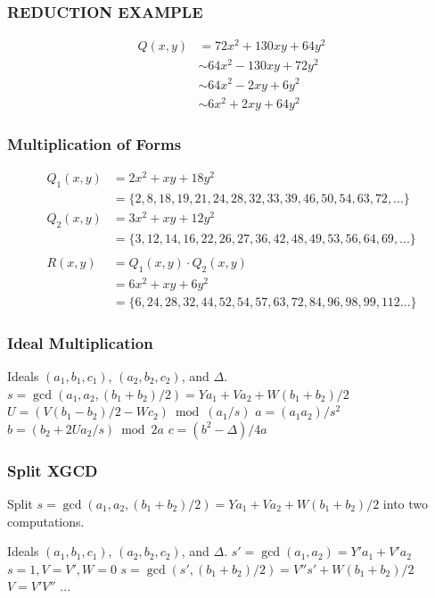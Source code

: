 \documentclass{beamer}
\begin{document}
\begin{frame}
\frametitle{REDUCTION EXAMPLE}
\begin{align*}
Q(x, y) &= 72x^2 + 130xy + 64y^2 \\
&\sim 64x^2 -130xy + 72y^2 \\
&\sim 64x^2 -2xy + 6y^2 \\
&\sim 6x^2 +2xy +64y^2
\end{align*}
\end{frame}

\begin{frame}
\frametitle{Multiplication of Forms}
\begin{align*}
Q_1(x, y) &= 2x^2 + xy + 18y^2 \\
&= \{2,8,18,19,21,24,28,32,33,39,46,50,54,63,72,...\} \\
Q_2(x, y) &= 3x^2 +xy +12y^2 \\
&= \{3,12,14,16,22,26,27,36,42,48,49,53,56,64,69,...\} \\
\\
R(x,y) &= Q_1(x,y) \cdot Q_2(x,y) \\
&= 6x^2 + xy + 6y^2 \\
&= \{6,24,28,32,44,52,54,57,63,72,84,96,98,99,112...\}
\end{align*}
\end{frame}


\begin{frame}
\frametitle{Ideal Multiplication}
\begin{algorithmic}[1]
\Require Ideals $(a_1, b_1, c_1)$, $(a_2, b_2, c_2)$, and $\Delta$.
\State $s = \gcd(a_1, a_2, (b_1+b_2)/2) = Ya_1 + Va_2 + W(b_1+b_2)/2$
\State $U = (V(b_1-b_2)/2 - Wc_2) \bmod{(a_1/s)}$
\State $a = (a_1a_2)/s^2$
\State $b = (b_2 + 2Ua_2/s) \bmod{2a}$
\State $c = (b^2 - \Delta)/4a$
\end{algorithmic}
\end{frame}

\begin{frame}
\frametitle{Split XGCD}

Split $s = \gcd(a_1, a_2, (b_1+b_2)/2) = Ya_1 + Va_2 + W(b_1+b_2)/2$ into two computations.
\bigbreak

\begin{algorithmic}[1]
\Require Ideals $(a_1, b_1, c_1)$, $(a_2, b_2, c_2)$, and $\Delta$.
\State $s' = \gcd(a_1, a_2) = Y'a_1 + V'a_2$ 
\State $s = 1, V = V', W = 0$
\Else
\State $s = \gcd(s', (b_1 + b_2)/2) = V''s' + W(b_1 + b_2)/2$
\State $V = V'V''$ 
\EndIf
\State ...
\end{algorithmic}
\end{frame}
\end{document}

